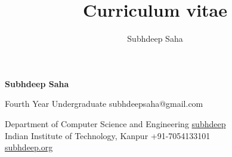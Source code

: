 \documentclass[9pt]{extarticle}
\title{Curriculum vitae}
\author{Subhdeep Saha}
\begin{document}
{\Huge\textbf{\sc Subhdeep Saha}}
\hfill


Fourth Year Undergraduate
\hfill
subhdeepsaha@gmail.com \faEnvelope

Department of Computer Science and Engineering
\hfill
\href{https://github.com/subhdeep}{subhdeep \faGithub}\\

Indian Institute of Technology, Kanpur
\hfill
+91-7054133101 \faMobile \\
\hfill
\href{https://subhdeep.org}{subhdeep.org \faHome}

\begin{minipage}[t]{0.49\textwidth}
  \vspace{2mm}
  
  
  
\end{minipage}
\hfill
\begin{minipage}[t]{0.49\textwidth}
  \vspace{2mm}
  
  \vspace{-4mm}
  
  
  \vspace{-2mm}
\end{minipage}
\end{document}
